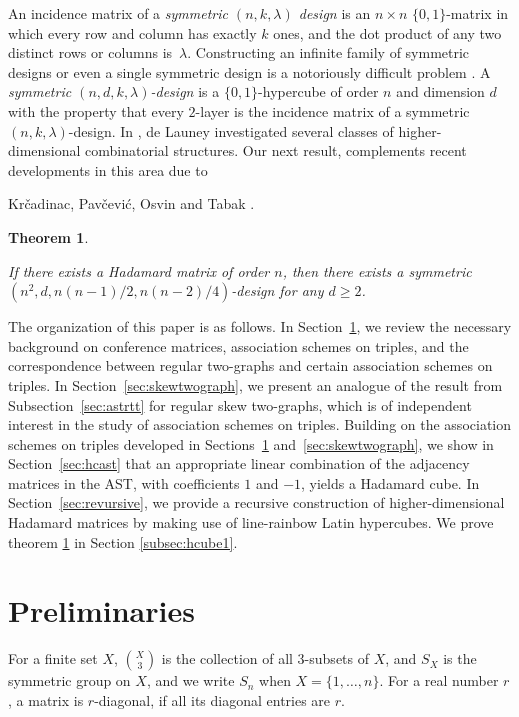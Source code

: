 \documentclass[11pt,oneside]{amsart}
\newcommand{\defn}[1]{\textit{#1}}
\newtheorem{thm}{Theorem}
\begin{document}
An incidence matrix of a {\it symmetric $(n,k,\lambda)$ design} is an $n\times n$ $\{0,1\}$-matrix in which every row and column has exactly $k$ ones, and the dot product of any two distinct rows or columns is~$\lambda$. Constructing an infinite family of symmetric designs or even a single symmetric design is a notoriously difficult problem \cite{MR2234039}. A \defn{symmetric $(n,d, k,\lambda)$-design} is a  $\{0,1\}$-hypercube of order $n$ and dimension $d$ with the property that every 
 $2$-layer is the incidence matrix of a symmetric $(n,k,\lambda)$-design. 
In \cite{MR1126968}, de Launey investigated several classes of higher-dimensional combinatorial structures. Our next result, complements  recent developments in this area  due to   {Kr{\v c}adinac, Pav{\v c}evi\'c, Osvin and Tabak \cite{MR4870040,Krčadinac01072025}.

\begin{thm}\label{introthm:hcubeproper}

    If there exists a Hadamard matrix of order $n$, then there exists a symmetric $(n^2,d, n(n-1)/2,n(n-2)/4)$-design for any $d\geq 2$. 
\end{thm}


The organization of this paper is as follows. 
In Section~\ref{sec:prelim}, we review the necessary background on conference matrices, association schemes on triples, and the correspondence between regular two-graphs and certain  association schemes on triples. In Section~\ref{sec:skewtwograph}, we present an analogue of the result from Subsection~\ref{sec:astrtt} for regular skew two-graphs, which is of independent interest in the study of association schemes on triples. Building on the association schemes on triples developed in Sections~\ref{sec:prelim} and~\ref{sec:skewtwograph}, we show in Section~\ref{sec:hcast} that an appropriate linear combination of the adjacency matrices in the AST, with coefficients $1$ and $-1$, yields a Hadamard cube. In Section~\ref{sec:revursive}, we provide a recursive construction of higher-dimensional Hadamard matrices by making use of line-rainbow  Latin hypercubes. We prove theorem \ref{introthm:hcubeproper} in Section \ref{subsec:hcube1}.


\section{Preliminaries}\label{sec:prelim}
For a finite set $X$, $\binom{X}{3}$ is the collection of all 3-subsets of $X$, and $S_X$ is  the symmetric group on  $X$, and we write $S_n$ when $X=\{1,\dots,n\}$. For a real number $r$, a matrix is $r$-diagonal, if all its diagonal entries are $r$. 

}
\end{document}
